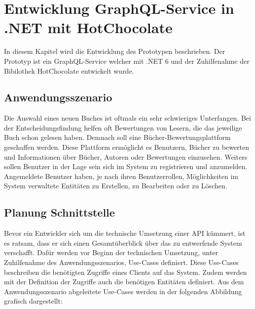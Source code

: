 \chapter{Entwicklung GraphQL-Service in .NET mit HotChocolate}
In diesem Kapitel wird die Entwicklung des Prototypen beschrieben.
Der Prototyp ist ein GraphQL-Service welcher mit .NET 6 und der Zuhilfenahme der Bibilothek HotChocolate entwickelt wurde.

\section{Anwendungsszenario}
Die Auswahl eines neuen Buches ist oftmals ein sehr schwieriges Unterfangen.
Bei der Entscheidungsfindung helfen oft Bewertungen von Lesern, die das jeweilige Buch schon gelesen haben.
Demnach soll eine Bücher-Bewertungsplattform geschaffen werden.
Diese Plattform ermöglicht es Benutzern, Bücher zu bewerten und Informationen über Bücher, Autoren oder Bewertungen einzusehen.
Weiters sollen Benutzer in der Lage sein sich im System zu registrieren und anzumelden.
Angemeldete Benutzer haben, je nach ihren Benutzerrollen, Möglichkeiten im System verwaltete Entitäten zu Erstellen, zu Bearbeiten oder zu Löschen.

\section{Planung Schnittstelle}
Bevor ein Entwickler sich um die technische Umsetzung einer API kümmert, ist es ratsam, dass er sich einen Gesamtüberblick über das zu entwerfende System verschafft.
Dafür werden vor Beginn der technischen Umsetzung, unter Zuhilfenahme des Anwendungsszenarios, Use-Cases definiert.
Diese Use-Cases beschreiben die benötigten Zugriffe eines Clients auf das System.
Zudem werden mit der Definition der Zugriffe auch die benötigen Entitäten definiert.
Aus dem Anwendungsszenario abgeleitete Use-Cases werden in der folgenden Abbildung grafisch dargestellt:

